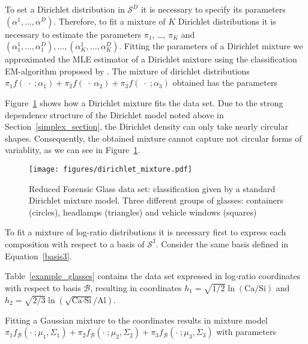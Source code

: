 \documentclass[12pt, a4paper]{article}
\begin{document}
To set a Dirichlet distribution in $\mathcal{S}^D$ it is necessary to specify its parameters $\left( \alpha^1, \dots ,\alpha^D \right)$. Therefore, to fit a mixture of $K$ Dirichlet distributions it is necessary to estimate the parameters $\pi_1$, \dots, $\pi_K$ and $\left( \alpha^1_1, \dots ,\alpha^D_1 \right), \dots, \left( \alpha^1_K, \dots, \alpha^D_K \right)$. Fitting the parameters of a Dirichlet mixture we approximated the MLE estimator of a Dirichlet mixture using the classification EM-algorithm proposed by \cite{celeux1992classification}. The mixture of dirichlet distributions $
\pi_1 f(\;\cdot\; ; \alpha_1) + \pi_2 f(\;\cdot\; \alpha_2) + \pi_3 f(\;\cdot\; ; \alpha_3)
$
obtained has the parameters
{\small  }


Figure~\ref{fig06fittingdirichlet} shows how a Dirichlet mixture fits the data set. Due to the strong dependence structure of the Dirichlet model noted above in Section~\ref{simplex_section}, the Dirichlet density can only take nearly circular shapes. Consequently, the obtained mixture cannot capture not circular forms of variablity, as we can see in Figure~\ref{fig06fittingdirichlet}.

\begin{figure}[htbp]
\centering
\texttt{[image: figures/dirichlet\_mixture.pdf]}
\caption{Reduced Forensic Glass data set: classification given by a standard Dirichlet mixture model. Three different groups of glasses: containers (circles), headlamps (triangles) and vehicle windows (squares)}
\label{fig06fittingdirichlet}
\end{figure}

To fit a mixture of log-ratio distributions it is necessary first to express each composition with respect to a basis of $\mathcal{S}^3$. Consider the same basis defined in Equation~\ref{basis3}.

Table~\ref{example_glasses} contains the data set expressed in log-ratio coordinates with respect to basis $\mathcal{B}$, resulting in coordinates $h_1 = \sqrt{1/2} \ln(\text{Ca}/\text{Si})$ and $h_2 = \sqrt{2/3} \ln(\sqrt{\text{Ca} \cdot \text{Si}} / \text{Al})$.



Fitting a Gaussian mixture to the coordinates results in mixture model
$
\pi_1 f_{\mathcal{B}}(\cdot\;; \mu_1, \Sigma_1) + \pi_2 f_{\mathcal{B}}(\cdot\;; \mu_2, \Sigma_2) + \pi_3 f_{\mathcal{B}}(\cdot\;; \mu_3, \Sigma_3)
$
with parameters
\end{document}
